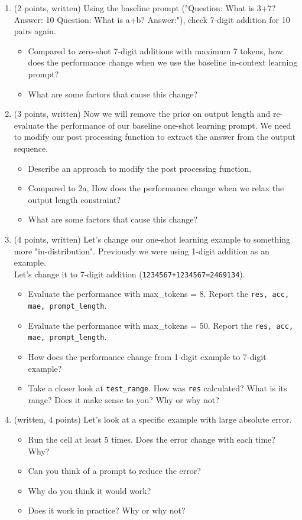 \documentclass{article}
\theoremstyle{case}
\theoremstyle{definition}
\begin{document}
\begin{enumerate}[label=\alph*.]
\item (2 points, written) Using the baseline prompt ("Question: What is 3+7? Answer: 10 Question: What is a+b? Answer:"), check 7-digit addition for 10 pairs again. 
\begin{itemize}
    \item Compared to zero-shot 7-digit additions with maximum 7 tokens, how does the performance change when we use the baseline in-context learning prompt? 
    \item What are some factors that cause this change?
\end{itemize}
\newpage
\item (3 points, written) Now we will remove the prior on output length and re-evaluate the performance of our baseline one-shot learning prompt. We need to modify our post processing function to extract the answer from the output sequence. 
\begin{itemize}
    \item Describe an approach to modify the post processing function.
    \item Compared to 2a, How does the performance change when we relax the output length constraint? 
    \item  What are some factors that cause this change?
\end{itemize}
\newpage
\item (4 points, written) Let's change our one-shot learning example to something more "in-distribution". Previously we were using 1-digit addition as an example. \\Let's change it to 7-digit addition (\texttt{1234567+1234567=2469134}). 
\begin{itemize}
    \item Evaluate the performance with max\_tokens = 8. Report the \texttt{res, acc, mae, prompt\_length}.
    \item Evaluate the performance with max\_tokens = 50. Report the \texttt{res, acc, mae, prompt\_length}.
    \item How does the performance change from 1-digit example to 7-digit example?
    \item Take a closer look at \texttt{test\_range}. How was \texttt{res} calculated? What is its range? Does it make sense to you? Why or why not?
\end{itemize}
\newpage
\item (written, 4 points) Let's look at a specific example with large absolute error. 
\begin{itemize}
    \item Run the cell at least 5 times. Does the error change with each time? Why?
    \item Can you think of a prompt to reduce the error? 
    \item Why do you think it would work?
    \item Does it work in practice? Why or why not?
\end{itemize}
\end{enumerate}
\end{document}
